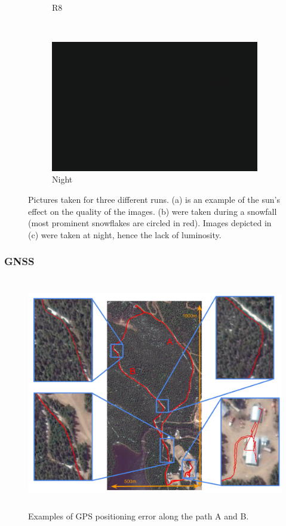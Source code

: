 \begin{figure}[htpb]
\begin{center}
\begin{subfigure}[b]{0.32\textwidth}
			\caption{R8}
			\label{fig:cameras_b}
		\end{subfigure}
		~
		\begin{subfigure}[b]{0.32\textwidth}
			\includegraphics[width=\linewidth]{figs/camera/figure_camera_dark_bottom.pdf}
			\caption{Night}
			\label{fig:cameras_c}
		\end{subfigure}%
	\caption{Pictures taken for three different runs. (a) is an example of the sun's effect on the quality of the images. (b) were taken during a snowfall (most prominent snowflakes are circled in red). Images depicted in (c) were taken at night, hence the lack of luminosity.} 
	\label{fig:cameras_expo}
	\end{center}
\end{figure}

\subsubsection{GNSS}
\label{sec:res_gnss}

\lightlipsum[1]

\begin{figure} [htpb]
	\centering
	\includegraphics[height=4.0in]{./figs/GPS/FR_gps_data_fails2.pdf}
	\caption{Examples of GPS positioning error along the path A and B.}
	\label{fig:gnss_error_path}
\end{figure}


